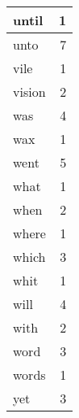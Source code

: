 \begin{center}
\begin{longtable}{l|r}
until & 1 \\ \hline
unto & 7 \\ \hline
vile & 1 \\ \hline
vision & 2 \\ \hline
was & 4 \\ \hline
wax & 1 \\ \hline
went & 5 \\ \hline
what & 1 \\ \hline
when & 2 \\ \hline
where & 1 \\ \hline
which & 3 \\ \hline
whit & 1 \\ \hline
will & 4 \\ \hline
with & 2 \\ \hline
word & 3 \\ \hline
words & 1 \\ \hline
yet & 3 \\ \hline
\end{longtable}
\end{center}



\normalsize



